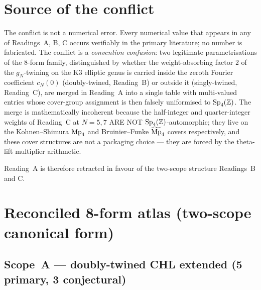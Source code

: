 \section*{Source of the conflict}

The conflict is not a numerical error. Every numerical value that
appears in any of Readings~A, B, C occurs verifiably in the primary
literature; no number is fabricated. The conflict is a
\emph{convention confusion}: two legitimate parametrisations of the
8-form family, distinguished by whether the weight-absorbing factor
$2$ of the $g_N$-twining on the K3 elliptic genus is carried inside
the zeroth Fourier coefficient $c_N(0)$ (doubly-twined, Reading~B) or
outside it (singly-twined, Reading~C), are merged in Reading~A into a
single table with multi-valued entries whose cover-group assignment is
then falsely uniformised to $\mathrm{Sp}_4(\mathbb Z)$. The merge is mathematically
incoherent because the half-integer and quarter-integer weights of
Reading~C at $N = 5, 7$ ARE NOT $\mathrm{Sp}_4(\mathbb Z)$-automorphic; they live on
the Kohnen--Shimura $\mathrm{Mp}_4$ and Bruinier--Funke $\widetilde{\mathrm{Mp}}_4$ covers
respectively, and these cover structures are not a packaging choice
--- they are forced by the theta-lift multiplier arithmetic.

Reading~A is therefore retracted in favour of the two-scope structure
Readings~B and C.

\section*{Reconciled 8-form atlas (two-scope canonical form)}

\subsection*{Scope~A --- doubly-twined CHL extended (5 primary, 3 conjectural)}

